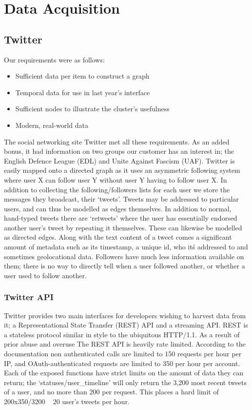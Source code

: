 \section{Data Acquisition}

\subsection{Twitter}
Our requirements were as follows:
\begin{itemize}
\item Sufficient data per item to construct a graph
\item Temporal data for use in last year's interface
\item Sufficient nodes to illustrate the cluster’s usefulness
\item Modern, real-world data
\end{itemize}

The social networking site Twitter met all these requirements. As an added bonus, it had information on two groups our customer has an interest in; the English Defence League (EDL) and Unite Against Fascism (UAF). Twitter is easily mapped onto a directed graph as it uses an asymmetric following system where user X can follow user Y without user Y having to follow user X. In addition to collecting the following/followers lists for each user we store the messages they broadcast, their `tweets'. Tweets may be addressed to particular users, and can thus be modelled as edges themselves. In addition to normal, hand-typed tweets there are  `retweets' where the user has essentially endorsed another user’s tweet by repeating it themselves. These can likewise be modelled as directed edges. Along with the text content of a tweet comes a significant amount of metadata such as its timestamp, a unique id, who it\'s addressed to and sometimes geolocational data. Followers have much less information available on them; there is no way to directly tell when a user followed another, or whether a user used to follow another.

\subsubsection{Twitter API}
Twitter provides two main interfaces for developers wishing to harvest data from it; a Representational State Transfer (REST) API and a streaming API. REST is a stateless protocol similar in style to the ubiquitous HTTP/1.1. As a result of prior abuse and overuse The REST API is heavily rate limited. According to the documentation non authenticated calls are limited to 150 requests per hour per IP, and OAuth-authenticated requests are limited to 350 per hour per account. Each of the exposed functions have strict limits on the amount of data they can return; the `statuses/user\_timeline' will only return the 3,200 most recent tweets of a user, and no more than 200 per request. This places a hard limit of 200x350/3200 ~ 20 user's tweets per hour. 

